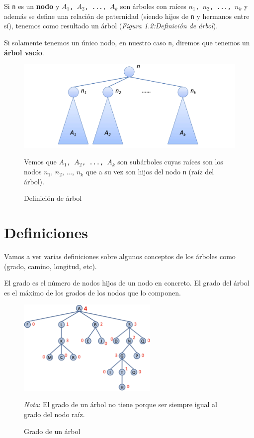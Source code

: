 \newpage
{}

Si \texttt{n} es un \textbf{nodo} y \texttt{$A_1$, $A_2$, ..., $A_k$} son árboles con raíces \texttt{$n_1$, $n_2$, ..., $n_k$} y además se define una relación de paternidad (siendo hijos de \texttt{n} y hermanos entre sí), tenemos como resultado un árbol (\textit{Figura 1.2:Definición de árbol}).

Si solamente tenemos un único nodo, en nuestro caso \texttt{n}, diremos que tenemos un \textbf{árbol vacío}.

\begin{figure}[h]
  \begin{center}
    \includegraphics[width=\textwidth]{assets/IntroArboles2.png}
  \end{center}
  \caption{Definición de árbol}
  Vemos que \texttt{$A_1$, $A_2$, ..., $A_k$} son subárboles cuyas raíces son los nodos {$n_1$, $n_2$, ..., $n_k$} que a su vez son hijos del nodo \texttt{n} (raíz del árbol).
\end{figure}

\section{Definiciones}
Vamos a ver varias definiciones sobre algunos conceptos de los árboles como (grado, camino, longitud, etc).

 El grado es el número de nodos hijos de un nodo en concreto. El grado del árbol es el máximo de los grados de los nodos que lo componen.
\begin{figure}[h]
  \begin{center}
    \includegraphics[width=0.6\textwidth]{assets/IntroArboles3.png}
  \end{center}
  \caption{Grado de un árbol}
  \textit{Nota}: El grado de un árbol no tiene porque ser siempre igual al grado del nodo raíz.
\end{figure}

